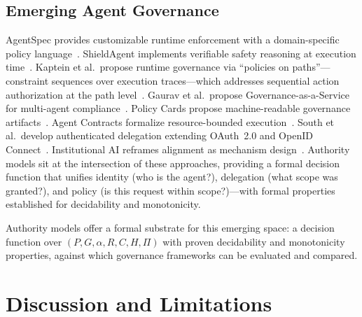 \documentclass[11pt,a4paper]{article}
\begin{document}
\subsection{Emerging Agent Governance}

AgentSpec provides customizable runtime enforcement with a domain-specific policy language~\citep{wang2025agentspec}. ShieldAgent implements verifiable safety reasoning at execution time~\citep{chen2025shieldagent}. Kaptein et al.\ propose runtime governance via ``policies on paths''---constraint sequences over execution traces---which addresses sequential action authorization at the path level~\citep{kaptein2026runtimegovernance}. Gaurav et al.\ propose Governance-as-a-Service for multi-agent compliance~\citep{gaurav2025gaas}. Policy Cards propose machine-readable governance artifacts~\citep{mavracic2025policycards}. Agent Contracts formalize resource-bounded execution~\citep{ye2026agentcontracts}. South et al.\ develop authenticated delegation extending OAuth~2.0 and OpenID Connect~\citep{south2025authenticated, south2025identitymgmt, nagabhushanaradhya2025oidca}. Institutional AI reframes alignment as mechanism design~\citep{pierucci2026institutionalai, bracale2026institutionalcournot}. Authority models sit at the intersection of these approaches, providing a formal decision function that unifies identity (who is the agent?), delegation (what scope was granted?), and policy (is this request within scope?)---with formal properties established for decidability and monotonicity.

Authority models offer a formal substrate for this emerging space: a decision function over $(P, G, \alpha, R, C, H, \Pi)$ with proven decidability and monotonicity properties, against which governance frameworks can be evaluated and compared.


\section{Discussion and Limitations}
\label{sec:discussion}
\end{document}
